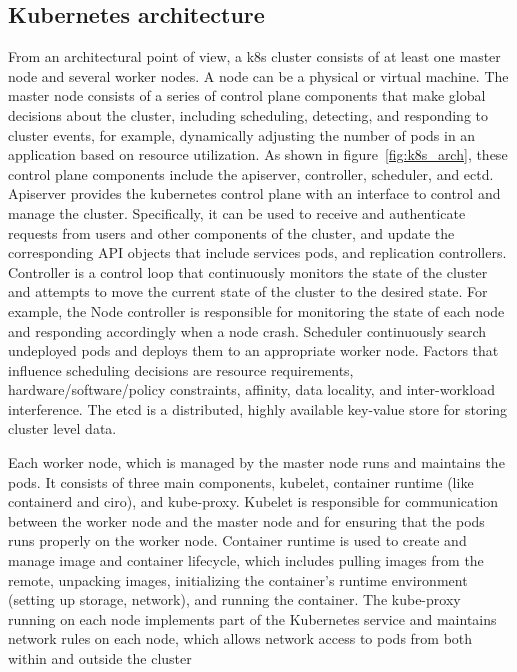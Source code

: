 \subsection{Kubernetes architecture}
From an architectural point of view, a k8s cluster consists of at least one master node and several worker nodes. A node can be a physical or virtual machine. The master node consists of a series of control plane components that make global decisions 
about the cluster, including scheduling, detecting, and responding to cluster events, for example, dynamically adjusting the number of 
pods in an application based on resource utilization. As shown in figure~\ref{fig:k8s_arch}, these control plane components include the apiserver, controller, scheduler, and ectd\cite*{k8s}. Apiserver provides the kubernetes control plane with an 
interface to control and manage the cluster. Specifically, it can be used to receive and authenticate requests from users and other components of the cluster, and update the corresponding API objects that include services pods, and replication 
controllers. Controller is a control loop that continuously monitors the state of the cluster and attempts to move the current state of the cluster to the desired state. For example, the Node controller is responsible for monitoring the state 
of each node and responding accordingly when a node crash. Scheduler continuously search undeployed pods and deploys them to an appropriate worker node. Factors that influence scheduling decisions are resource requirements, 
hardware/software/policy constraints, affinity, data locality, and inter-workload interference. The etcd is a distributed, highly available key-value store for storing cluster level data.

Each worker node, which is managed by the master node runs and maintains the pods. It consists of three main components, kubelet, container runtime (like containerd\cite*{containerd} and ciro\cite*{cri-o}), and kube-proxy. Kubelet is responsible for communication between the 
worker node and the master node and for ensuring that the pods runs properly on the worker node. Container runtime is used to create and manage image and  container lifecycle, which includes pulling images from the remote, unpacking images, 
initializing the container's runtime environment (setting up storage, network), and running the container. The kube-proxy running on each node implements part of the Kubernetes service and maintains network rules on each node, which allows 
network access to pods from both within and outside the cluster

